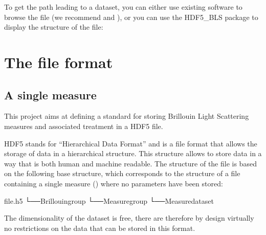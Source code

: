 \documentclass[letterpaper,10pt,english]{sphinxmanual}
\begin{document}
\sphinxAtStartPar
To get the path leading to a dataset, you can either use existing software to browse the file (we recommend  and ), or you can use the HDF5\_BLS package to display the structure of the file:

\begin{sphinxVerbatim}[commandchars=\\\{\}]
\end{sphinxVerbatim}

\sphinxstepscope


\chapter{The file format}
\label{\detokenize{source/file_format:the-file-format}}\label{\detokenize{source/file_format::doc}}

\section{A single measure}
\label{\detokenize{source/file_format:a-single-measure}}
\sphinxAtStartPar
This project aims at defining a standard for storing Brillouin Light Scattering measures and associated treatment in a HDF5 file.

\sphinxAtStartPar
HDF5 stands for “Hierarchical Data Format” and is a file format that allows the storage of data in a hierarchical structure. This structure allows to store data in a way that is both human and machine readable. The structure of the file is based on the following base structure, which corresponds to the structure of a file containing a single measure () where no parameters have been stored:

\begin{sphinxVerbatim}[commandchars=\\\{\}]
file.h5
└──Brillouingroup
└──Measuregroup
└──Measuredataset
\end{sphinxVerbatim}

\sphinxAtStartPar
The dimensionality of the dataset is free, there are therefore by design virtually no restrictions on the data that can be stored in this format.
\end{document}
